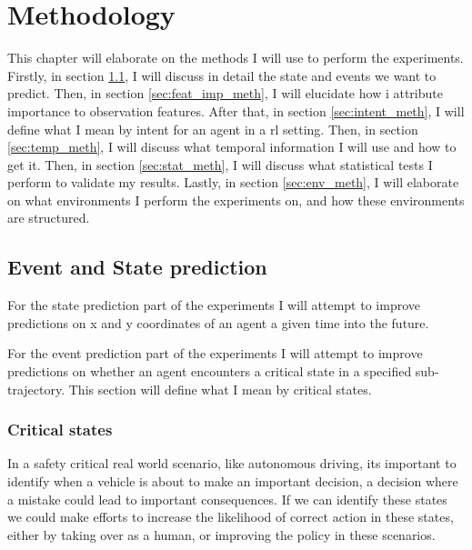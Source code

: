 \documentclass[UKenglish]{uiomasterthesis}
\begin{document}
\medskip
\chapter{Methodology}
This chapter will elaborate on the methods I will use to perform the experiments. Firstly, in section \ref{sec:event_state_meth}, I will discuss in detail the state and events we want to predict. Then, in section \ref{sec:feat_imp_meth}, I will elucidate how i attribute importance to observation features. After that, in section \ref{sec:intent_meth}, I will define what I mean by intent for an agent in a \ac{rl} setting. Then, in section \ref{sec:temp_meth}, I will discuss what temporal information I will use and how to get it. Then, in section \ref{sec:stat_meth}, I will discuss what statistical tests I perform to validate my results. Lastly, in section \ref{sec:env_meth}, I will elaborate on what environments I perform the experiments on, and how these environments are structured.


\section{Event and State prediction}
\label{sec:event_state_meth}
For the state prediction part of the experiments I will attempt to improve predictions on x and y coordinates of an agent a given time into the future. 

For the event prediction part of the experiments I will attempt to improve predictions on whether an agent encounters a critical state in a specified sub-trajectory. This section will define what I mean by critical states.

\subsection{Critical states}
In a safety critical real world scenario, like autonomous driving, its important to identify when a vehicle is about to make an important decision, a decision where a mistake could lead to important consequences. If we can identify these states we could make efforts to increase the likelihood of correct action in these states, either by taking over as a human, or improving the policy in these scenarios.
\end{document}
